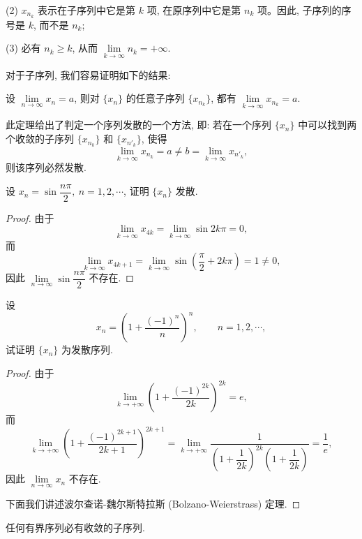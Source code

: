 (2) $x_{n_k}$ 表示在子序列中它是第 $k$ 项, 在原序列中它是第 $n_k$ 项。因此, 子序列的序号是 $k$, 而不是 $n_k$;

(3) 必有 $n_k\geqslant k$, 从而 $\lim\limits_{k\to\infty}n_k=+\infty$.

对于子序列, 我们容易证明如下的结果:

\begin{theorem}\label{theorem:ma-2-4-4}
设 $\lim\limits_{n\to\infty}x_n=a$, 则对 $\{x_n\}$ 的任意子序列 $\{x_{n_k}\}$, 都有 $\lim\limits_{k\to\infty}x_{n_k}=a$.
\end{theorem}

此定理给出了判定一个序列发散的一个方法, 即: 若在一个序列 $\{x_n\}$ 中可以找到两个收敛的子序列 $\{x_{n_k}\}$ 和 $\{x_{n'_k}\}$, 使得
\[
  \lim_{k\to\infty}x_{n_k}=a\ne b=\lim_{k\to\infty}x_{n'_k},
\]
则该序列必然发散.

\begin{example}\label{example:ma-2-4-6}
设 $x_n=\sin\dfrac{n\pi}{2},\ n=1,2,\cdots$, 证明 $\{x_n\}$ 发散.
\end{example}


\begin{proof}
由于
\[
  \lim_{k\to\infty}x_{4k}
  =
  \lim_{k\to\infty}\sin2k\pi=0,
\]
而
\[
  \lim_{k\to\infty}x_{4k+1}
  =
  \lim_{k\to\infty}\sin\left(\frac\pi2+2k\pi\right)=1\ne0,
\]
因此 $\lim\limits_{n\to\infty}\sin\dfrac{n\pi}{2}$ 不存在.
\end{proof}


\begin{example}\label{example:ma-2-4-7}
设
\[
  x_n=\left(1+\frac{(-1)^n}{n}\right)^n,\qquad n=1,2,\cdots,
\]
试证明 $\{x_n\}$ 为发散序列.
\end{example}


\begin{proof}
由于
\[
  \lim_{k\to+\infty}\left(1+\frac{(-1)^{2k}}{2k}\right)^{2k}=e,
\]
而
\[
  \lim_{k\to+\infty}\left(1+\frac{(-1)^{2k+1}}{2k+1}\right)^{2k+1}
  =
  \lim_{k\to+\infty}\frac1{\left(1+\dfrac1{2k}\right)^{2k}\left(1+\dfrac1{2k}\right)}
  =
  \frac1e,
\]
因此 $\lim\limits_{n\to\infty}x_n$ 不存在.

下面我们讲述波尔查诺-魏尔斯特拉斯 (Bolzano-Weierstrass) 定理.
\end{proof}


\begin{theorem}\label{theorem:ma-2-4-5}
任何有界序列必有收敛的子序列.
\end{theorem}


